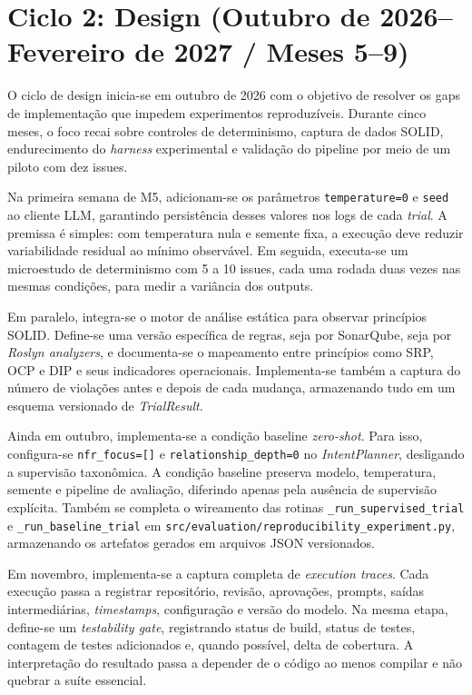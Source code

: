 \documentclass[12pt,a4paper]{article}
\begin{document}
\section*{Ciclo 2: Design (Outubro de 2026--Fevereiro de 2027 / Meses 5--9)}

O ciclo de design inicia-se em outubro de 2026 com o objetivo de resolver os gaps de implementação que impedem experimentos reproduzíveis. Durante cinco meses, o foco recai sobre controles de determinismo, captura de dados SOLID, endurecimento do \textit{harness} experimental e validação do pipeline por meio de um piloto com dez issues.

Na primeira semana de M5, adicionam-se os parâmetros \texttt{temperature=0} e \texttt{seed} ao cliente LLM, garantindo persistência desses valores nos logs de cada \textit{trial}. A premissa é simples: com temperatura nula e semente fixa, a execução deve reduzir variabilidade residual ao mínimo observável. Em seguida, executa-se um microestudo de determinismo com 5 a 10 issues, cada uma rodada duas vezes nas mesmas condições, para medir a variância dos outputs.

Em paralelo, integra-se o motor de análise estática para observar princípios SOLID. Define-se uma versão específica de regras, seja por SonarQube, seja por \textit{Roslyn analyzers}, e documenta-se o mapeamento entre princípios como SRP, OCP e DIP e seus indicadores operacionais. Implementa-se também a captura do número de violações antes e depois de cada mudança, armazenando tudo em um esquema versionado de \textit{TrialResult}.

Ainda em outubro, implementa-se a condição baseline \textit{zero-shot}. Para isso, configura-se \texttt{nfr\_focus=[]} e \texttt{relationship\_depth=0} no \textit{IntentPlanner}, desligando a supervisão taxonômica. A condição baseline preserva modelo, temperatura, semente e pipeline de avaliação, diferindo apenas pela ausência de supervisão explícita. Também se completa o wireamento das rotinas \texttt{\_run\_supervised\_trial} e \texttt{\_run\_baseline\_trial} em \texttt{src/evaluation/reproducibility\_experiment.py}, armazenando os artefatos gerados em arquivos JSON versionados.

Em novembro, implementa-se a captura completa de \textit{execution traces}. Cada execução passa a registrar repositório, revisão, aprovações, prompts, saídas intermediárias, \textit{timestamps}, configuração e versão do modelo. Na mesma etapa, define-se um \textit{testability gate}, registrando status de build, status de testes, contagem de testes adicionados e, quando possível, delta de cobertura. A interpretação do resultado passa a depender de o código ao menos compilar e não quebrar a suíte essencial.
\end{document}
